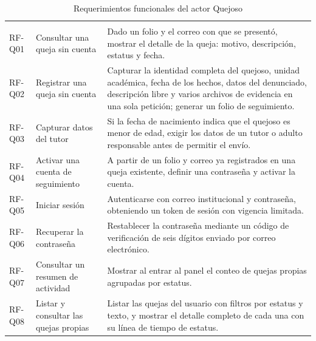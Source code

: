 	\small
	\renewcommand{\arraystretch}{1.2}
	\setlength{\tabcolsep}{4pt}
	
	\begin{longtable}{|p{1.5cm}|p{3.6cm}|p{9.0cm}|}
		\caption{Requerimientos funcionales del actor Quejoso}
		\label{tab:rf_quejoso} \\
		\hline
		\rowcolor{headerblue}
		\headercell{ID} & \headercell{Requerimiento} & \headercell{Descripción} \\
		\hline
		\endfirsthead
	
		\hline
		\rowcolor{headerblue}
		\headercell{ID} & \headercell{Requerimiento} & \headercell{Descripción} \\
		\hline
		\endhead
	
		RF-Q01 & Consultar una queja sin cuenta & Dado un folio y el correo con que se presentó,
		mostrar el detalle de la queja: motivo, descripción, estatus y fecha. \\ \hline
	
		RF-Q02 & Registrar una queja sin cuenta & Capturar la identidad completa del quejoso,
		unidad académica, fecha de los hechos, datos del denunciado, descripción libre y varios
		archivos de evidencia en una sola petición; generar un folio de seguimiento. \\ \hline
	
		RF-Q03 & Capturar datos del tutor & Si la fecha de nacimiento indica que el quejoso es menor
		de edad, exigir los datos de un tutor o adulto responsable antes de permitir el envío.
		\\ \hline
	
		RF-Q04 & Activar una cuenta de seguimiento & A partir de un folio y correo ya registrados en
		una queja existente, definir una contraseña y activar la cuenta. \\ \hline
	
		RF-Q05 & Iniciar sesión & Autenticarse con correo institucional y contraseña, obteniendo un
		token de sesión con vigencia limitada. \\ \hline
	
		RF-Q06 & Recuperar la contraseña & Restablecer la contraseña mediante un código de
		verificación de seis dígitos enviado por correo electrónico. \\ \hline
	
		RF-Q07 & Consultar un resumen de actividad & Mostrar al entrar al panel el conteo de quejas
		propias agrupadas por estatus. \\ \hline
	
		RF-Q08 & Listar y consultar las quejas propias & Listar las quejas del usuario con filtros
		por estatus y texto, y mostrar el detalle completo de cada una con su línea de tiempo de
		estatus. \\ \hline
	

\end{longtable}
